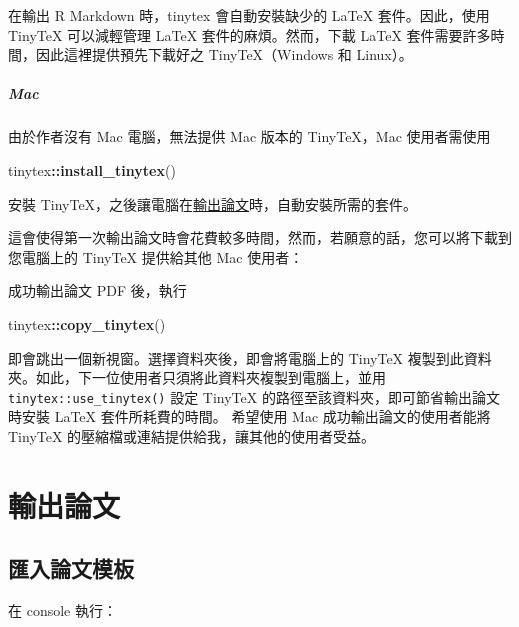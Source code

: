 \documentclass[oneside]{book}
\newenvironment{Shaded}{\begin{snugshade}}{\end{snugshade}}
\newcommand{\KeywordTok}[1]{\textcolor[rgb]{0.13,0.29,0.53}{\textbf{#1}}}
\newcommand{\NormalTok}[1]{#1}
\newcommand{\OperatorTok}[1]{\textcolor[rgb]{0.81,0.36,0.00}{\textbf{#1}}}
\theoremstyle{definition}
\theoremstyle{definition}
\theoremstyle{definition}
\theoremstyle{remark}
\begin{document}
在輸出 R Markdown 時，tinytex 會自動安裝缺少的 LaTeX 套件。因此，使用 TinyTeX 可以減輕管理 LaTeX 套件的麻煩。然而，下載 LaTeX 套件需要許多時間，因此這裡提供預先下載好之 TinyTeX（Windows 和 Linux）。

\hypertarget{mac}{%
\paragraph{Mac}\label{mac}}

由於作者沒有 Mac 電腦，無法提供 Mac 版本的 TinyTeX，Mac 使用者需使用

\begin{Shaded}
\begin{Highlighting}[]
\NormalTok{tinytex}\OperatorTok{::}\KeywordTok{install_tinytex}\NormalTok{()}
\end{Highlighting}
\end{Shaded}

安裝 TinyTeX，之後讓電腦在\protect\hyperlink{export-thesis}{輸出論文}時，自動安裝所需的套件。

這會使得第一次輸出論文時會花費較多時間，然而，若願意的話，您可以將下載到您電腦上的 TinyTeX 提供給其他 Mac 使用者：

成功輸出論文 PDF 後，執行

\begin{Shaded}
\begin{Highlighting}[]
\NormalTok{tinytex}\OperatorTok{::}\KeywordTok{copy_tinytex}\NormalTok{()}
\end{Highlighting}
\end{Shaded}

即會跳出一個新視窗。選擇資料夾後，即會將電腦上的 TinyTeX 複製到此資料夾。如此，下一位使用者只須將此資料夾複製到電腦上，並用 \texttt{tinytex::use\_tinytex()} 設定 TinyTeX 的路徑至該資料夾，即可節省輸出論文時安裝 LaTeX 套件所耗費的時間。
希望使用 Mac 成功輸出論文的使用者能將 TinyTeX 的壓縮檔或連結提供給我，讓其他的使用者受益。

\hypertarget{export-thesis}{%
\chapter{輸出論文}\label{export-thesis}}

\hypertarget{import-template}{%
\section{匯入論文模板}\label{import-template}}

在 console 執行：
\end{document}
